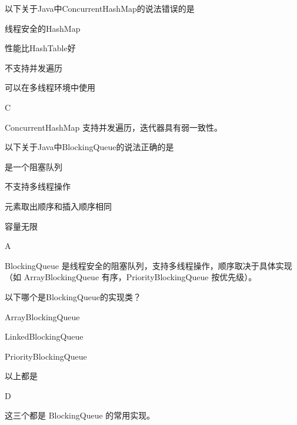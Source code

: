 \begin{question}
	以下关于Java中ConcurrentHashMap的说法错误的是
	\begin{options}
		\item 线程安全的HashMap
		\item 性能比HashTable好
		\item 不支持并发遍历
		\item 可以在多线程环境中使用
	\end{options}
	\begin{answer}
		C
	\end{answer}
	\begin{explanation}
		ConcurrentHashMap 支持并发遍历，迭代器具有弱一致性。
	\end{explanation}
\end{question}

\begin{question}
	以下关于Java中BlockingQueue的说法正确的是
	\begin{options}
		\item 是一个阻塞队列
		\item 不支持多线程操作
		\item 元素取出顺序和插入顺序相同
		\item 容量无限
	\end{options}
	\begin{answer}
		A
	\end{answer}
	\begin{explanation}
		BlockingQueue 是线程安全的阻塞队列，支持多线程操作，顺序取决于具体实现（如 ArrayBlockingQueue 有序，PriorityBlockingQueue 按优先级）。
	\end{explanation}
\end{question}

\begin{question}
	以下哪个是BlockingQueue的实现类？
	\begin{options}
		\item ArrayBlockingQueue
		\item LinkedBlockingQueue
		\item PriorityBlockingQueue
		\item 以上都是
	\end{options}
	\begin{answer}
		D
	\end{answer}
	\begin{explanation}
		这三个都是 BlockingQueue 的常用实现。
	\end{explanation}
\end{question}

